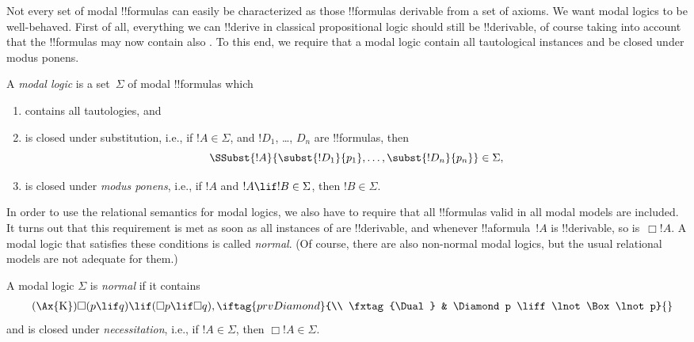\documentclass[../../../include/open-logic-section]{subfiles}
\begin{document}


Not every set of modal !!{formula}s can easily be characterized as
those !!{formula}s derivable from a set of axioms. We want modal
logics to be well-behaved. First of all, everything we can !!{derive}
in classical propositional logic should still be !!{derivable}, of
course taking into account that the !!{formula}s may now contain also
. To this end, we
require that a modal logic contain all tautological instances and be
closed under modus ponens.

\begin{defn}
  A \emph{modal logic} is a set~$\Sigma$ of modal !!{formula}s which
  \begin{enumerate}
  \item contains all tautologies, and
  \item is closed under substitution, i.e., if $!A \in \Sigma$, and
    $!D_1$, \dots, $D_n$ are !!{formula}s, then
    \[
    \SSubst{!A}{\subst{!D_1}{p_1}, \dots, \subst{!D_n}{p_n}} \in \Sigma,
    \]
    \item is closed under \emph{modus ponens}, i.e., if $!A$ and $!A
      \lif !B \in \Sigma$, then $!B \in \Sigma$.
  \end{enumerate}
\end{defn}

In order to use the relational semantics for modal logics, we also
have to require that all !!{formula}s valid in all modal models are
included. It turns out that this requirement is met as soon as all
instances of  are
!!{derivable}, and whenever !!a{formula}~$!A$ is !!{derivable}, so
is~$\Box !A$. A modal logic that satisfies these conditions is called
\emph{normal}. (Of course, there are also non-normal modal logics, but
the usual relational models are not adequate for them.)

\begin{defn}
  A modal logic $\Sigma$ is \emph{normal} if it contains
  \begin{align*}
    \tag{\Ax{K}} & \Box(p \lif q) \lif (\Box p \lif \Box q),
    \iftag{prvDiamond}{\\
      \tag{\Dual} & \Diamond p \liff \lnot\Box\lnot p}{}
  \end{align*}
  and is closed under \emph{necessitation}, i.e., if $!A \in
  \Sigma$, then $\Box !A \in \Sigma$.
\end{defn}
\end{document}
